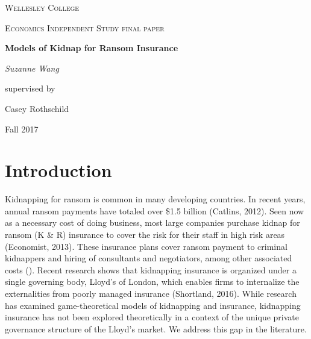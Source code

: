\documentclass[12pt]{article}
\begin{document}
 

\begin{titlepage}
  \centering
  {\scshape\LARGE Wellesley College \par}
  \vspace{1cm}
  {\scshape\Large Economics Independent Study final paper\par}
  \vspace{2.5cm}
  {\huge\bfseries Models of Kidnap for Ransom Insurance\par}
  \vspace{2cm}
  {\Large\itshape Suzanne Wang\par}
  supervised by\par
  Casey Rothschild

  \vfill

  {\large Fall 2017\par}
\end{titlepage}

\section{Introduction}

Kidnapping for ransom is common in many developing countries. In recent years, annual ransom payments have totaled over \$1.5 billion (Catlins, 2012). Seen now as a necessary cost of doing business, most large companies purchase kidnap for ransom (K \& R) insurance to cover the risk for their staff in high risk areas (Economist, 2013). These insurance plans cover ransom payment to criminal kidnappers and hiring of consultants and negotiators, among other associated costs (). Recent research shows that kidnapping insurance is organized under a single governing body, Lloyd's of London, which enables firms to internalize the externalities from poorly managed insurance (Shortland, 2016). While research has examined game-theoretical models of kidnapping and insurance, kidnapping insurance has not been explored theoretically in a context of the unique private governance structure of the Lloyd's market. We address this gap in the literature.
\end{document}
